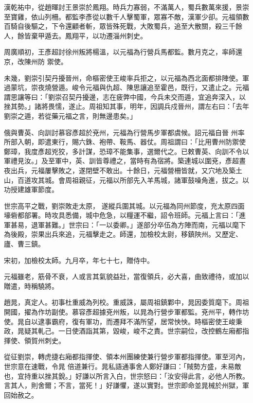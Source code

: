 \begin{pinyinscope}
 漢乾祐中，從趙暉討王景崇於鳳翔。時兵力寡弱，不滿萬人，蜀兵數萬來援，景崇至寶雞，依山列柵。都監李彥從以數千人擊蜀軍，眾寡不敵，漢軍少卻。元福領數百騎自後驅之，下令還顧者斬，眾皆殊死戰，大敗蜀兵，追至大散關，殺三千餘人，餘皆棄甲遁去。鳳翔平，以功遷淄州刺史。



 周廣順初，王彥超討徐州叛將楊溫，以元福為行營兵馬都監。數月克之，率師還京，改陳州防
 禦使。



 未幾，劉崇引契丹擾晉州，命樞密使王峻率兵拒之，以元福為西北面都排陣使。軍過蒙坑，崇夜燒營遁。峻令元福與仇超、陳思讓追至霍邑，既行，又遣止之。元福謂思讓等曰：「劉崇召契丹擾邊，志在疲弊中國，今兵未交而遁，宜追奔深入，以挫其勢。」諸將畏懦，遂止。周祖知其事，明年，因調兵戍晉州，謂左右曰：「去年劉崇之遁，若從藥元福之言，則無邊患矣。」



 俄與曹英、向訓討慕容彥超於兗州，元福為行營馬步軍都虞候。詔元福自晉
 州率所部入朝，即遣東行，賜六銖、袍帶、鞍馬、器仗。周祖謂曰：「比用曹州防禦使鄭璋，我度彥超兇狡，多計謀，恐璋不能集事，選爾代之。已敕曹英、向訓不令以軍禮見汝。」及至軍中，英、訓皆尊禮之，當時有為宿將。築連城以圍兗，彥超晝夜出兵，元福屢擊敗之，遂閉壁不敢出。十餘日，元福營柵皆就，又穴地及築土山，百道攻其城。會周祖親征，元福以所部先入羊馬城，諸軍鼓噪角進，拔之。以功授建雄軍節度。



 世宗高平之戰，劉崇敗走太原，
 遂縱兵圍其城。以元福為同州節度，充太原四面壕砦都部署。時攻具悉備，城中危急，以糧運不繼，詔令班師。元福上言曰：「進軍甚易，退軍甚難。」世宗曰：「一以委卿。」遂部分卒伍為方陣而南，元福以麾下為後殿，崇果出兵來追，元福擊走之。師還，加檢校太尉，移鎮陜州。又歷定、廬、曹三鎮。



 宋初，加檢校太師。九月卒，年七十七，贈侍中。



 元福雖老，筋骨不衰，人或言其氣貌益壯，當復領兵，必大喜，曲致禮待，或加以贈遣，時稱驍將。



 趙晁，真定人。初事杜重威為列校。重威誅，屬周祖鎮鄴中，晁因委質麾下。周祖開國，擢為作坊副使。慕容彥超據兗州叛，以晁為行營步軍都監。兗州平，轉作坊使。晁自以逮事霸府，復有軍功，而遷拜不滿所望，居常怏怏。時樞密使王峻秉政，晁疑其軋己。一日使酒詣其第，毀峻，峻不之責。世宗嗣位，改控鶴左廂都指揮使、領賀州刺史。



 從征劉崇，轉虎捷右廂都指揮使、領本州團練使兼行營步軍都指揮使。軍至河內，世宗意在速戰，令晁
 倍道兼行。晁私語通事舍人鄭好謙曰：「賊勢方盛，未易敵也，宜持重以挫其銳。」好謙以所言入白，世宗怒曰：「汝安得此言，必他人所教。言其人，則舍爾；不言，當死！」好謙懼，遂以實對。世宗即命並晁械於州獄，軍回始赦之。




\end{pinyinscope}
